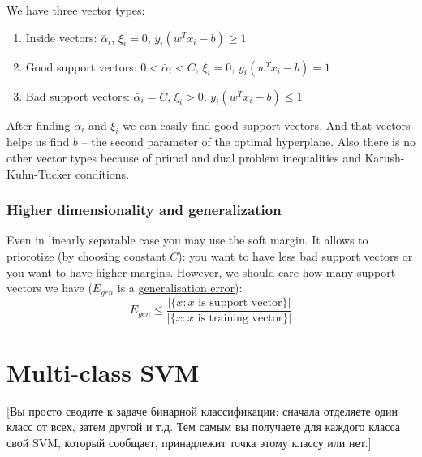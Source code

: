 We have three vector types:
\begin{enumerate}[label=\arabic*.]
	\item Inside vectors: $\bar\alpha_i$, $\xi_i=0$, $y_i(w^Tx_i-b)\ge1$
	\item Good support vectors: $0<\bar\alpha_i<C$, $\xi_i=0$, $y_i(w^Tx_i-b)=1$
	\item Bad support vectors: $\bar\alpha_i=C$, $\xi_i>0$, $y_i(w^Tx_i-b)\le1$
\end{enumerate}
After finding $\bar\alpha_i$ and $\xi_i$ we can easily find good support vectors. And that vectors helps us find $b$ -- the second parameter of the optimal hyperplane. Also there is no other vector types because of primal and dual problem inequalities and Karush-Kuhn-Tucker conditions.

\subsubsection*{Higher dimensionality and generalization}

Even in linearly separable case you may use the soft margin. It allows to priorotize (by choosing constant $C$): you want to have less bad support vectors or you want to have higher margins. However, we should care how many support vectors we have ($E_{gen}$ is a \hyperlink{gen_error}{generalisation error}):
$$E_{gen}\le\frac{|\{x\colon x \text{ is support vector}\}|}{|\{x\colon x \text{ is training vector}\}|}$$

\section{Multi-class SVM}

[Вы просто сводите к задаче бинарной классификации: сначала отделяете один класс от всех, затем другой и т.д. Тем самым вы получаете для каждого класса свой SVM, который сообщает, принадлежит точка этому классу или нет.]